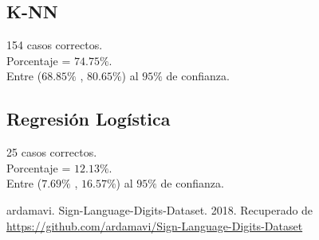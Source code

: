\documentclass{article}
\begin{document}
    \subsection{K-NN}
        154 casos correctos.\\
        Porcentaje = $74.75\%$.\\
        Entre ($68.85\%$ , $80.65\%$) al $95\%$ de confianza.
    \subsection{Regresión Logística}
        25 casos correctos.\\
        Porcentaje = $12.13\%$.\\
        Entre ($7.69\%$ , $16.57\%$) al $95\%$ de confianza.

      \begin{thebibliography}{9}
            ardamavi.
            Sign-Language-Digits-Dataset.
            2018.
            Recuperado de \url{https://github.com/ardamavi/Sign-Language-Digits-Dataset}
      \end{thebibliography}
\end{document}
